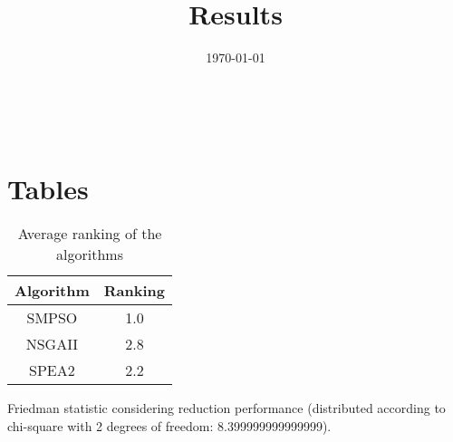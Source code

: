 \documentclass{article}
\title{Results}
\author{}
\date{\today}
\begin{document}
\oddsidemargin 0in \topmargin 0in\maketitle
\
\section{Tables}
\begin{table}[!htp]
\centering
\caption{Average ranking of the algorithms}
\begin{tabular}{c|c}
Algorithm&Ranking\\
\hline
SMPSO&1.0\\
NSGAII&2.8\\
SPEA2&2.2\\
\end{tabular}
\end{table}


Friedman statistic considering reduction performance (distributed according to chi-square with 2 degrees of freedom: 8.399999999999999).
\end{document}
